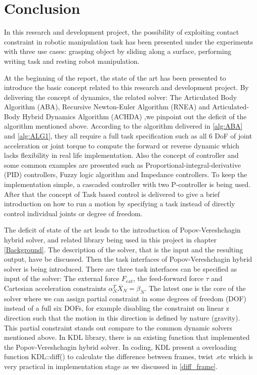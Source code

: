 \documentclass[report.tex]{subfiles}
\begin{document}
\chapter{Conclusion}
In this research and development project, the possibility of exploiting contact constraint in robotic manipulation task has been presented under the experiments with three use cases: grasping object by sliding along a surface, performing writing task and resting robot manipulation.

At the beginning of the report, the state of the art has been presented to introduce the basic concept related to this research and development project. By delivering the concept of dynamics, the related solver: The Articulated Body Algorithm (ABA), Recursive Newton-Euler Algorithm (RNEA) and Articulated-Body Hybrid Dynamics Algorithm (ACHDA) ,we pinpoint out the deficit of the algorithm mentioned above. According to the algorithm delivered in \ref{alg:ABA} and \ref{alg:ALG1}, they all require a full task specification such as all 6 DoF of joint acceleration or joint torque to compute the forward or reverse dynamic which lacks flexibility in real life implementation. Also the concept of controller and some common examples are presented such as Proportional-integral-derivative (PID) controllers, Fuzzy logic algorithm and Impedance controllers. To keep the implementation simple, a cascaded controller with two P-controller is being used. After that the concept of Task based control is delivered to give a brief introduction on how to run a motion by specifying a task instead of directly control individual joints or degree of freedom.

The deficit of state of the art leads to the introduction of Popov-Vereshchagin hybrid solver, and related library being used in this project in chapter \ref{Background}. The description of the solver, that is the input and the resulting output, have be discussed. Then the task interfaces of Popov-Vereshchagin hybrid solver is being introduced. There are three task interfaces can be specified as input of the solver: The external force $F_{ext}$, the feed-forward force $\tau$ and Cartesian acceleration constraints $\alpha_N^T \ddot{X_N} = \beta_N$. The latest one is the core of the solver where we can assign partial constraint in some degrees of freedom (DOF) instead of a full six DOFs, for example disabling the constraint on linear z direction such that the motion in this direction is defined by nature (gravity). This partial constraint stands out compare to the common dynamic solvers mentioned above. In KDL library, there is an existing function that implemented the Popov-Vereshchagin hybrid solver. In coding, KDL present a overloading function KDL::diff() to calculate the difference between frames, twist .etc which is very practical in implementation stage as we discussed in \ref{diff_frame}.
\end{document}
